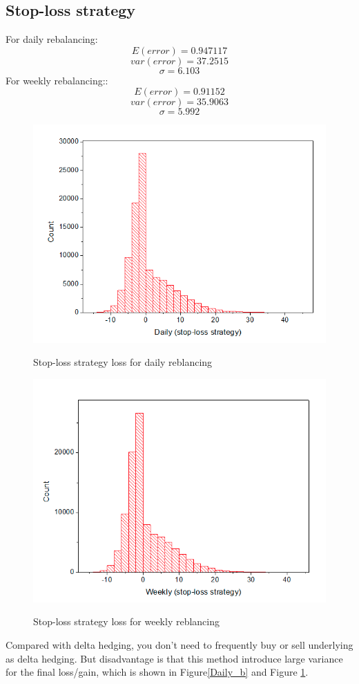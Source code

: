 \documentclass{report}
\begin{document}
\subsection*{Stop-loss strategy} 
For daily rebalancing:  $$ E(error) = 0.947117$$
$$ var(error) = 37.2515 $$
$$ \sigma = 6.103 $$
For weekly rebalancing:: $$ E(error) = 0.91152$$
$$ var(error) =35.9063 $$
$$ \sigma = 5.992$$
\begin{figure} \centering
\includegraphics[width=\textwidth]{Daily_b}\label{Daily_b}
\caption{Stop-loss strategy loss for daily reblancing}  
\includegraphics[width=\textwidth]{Weekly_b}\label{Weekly_b}
\caption{Stop-loss strategy loss for weekly reblancing}  
\end{figure}
Compared with delta hedging, you don't need to frequently buy or sell underlying as delta hedging.  But disadvantage is that this method introduce large variance for the final loss/gain, which is shown in Figure\ref{Daily_b} and Figure \ref{Weekly_b}. 
\end{document}
